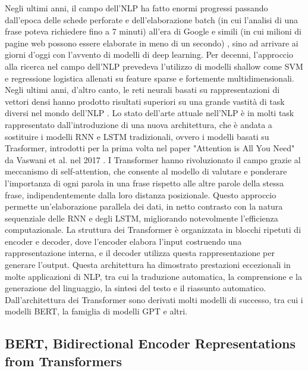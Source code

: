 \documentclass[../../Thesis.tex]{subfiles}
\begin{document}
Negli ultimi  anni, il campo dell'NLP ha fatto enormi progressi passando dall'epoca delle schede perforate e dell'elaborazione batch (in cui l'analisi di una frase poteva richiedere fino a 7 minuti) all'era di Google e simili (in cui milioni di pagine web possono essere elaborate in meno di un secondo) \cite{6786458}, sino ad arrivare ai giorni d'oggi con l'avvento di modelli di deep learning. Per decenni, l'approccio alla ricerca nel campo dell'NLP prevedeva l'utilizzo di modelli shallow come SVM \cite{SVM} e regressione logistica allenati su feature sparse e fortemente multidimensionali. Negli ultimi anni, d'altro canto,  le reti neurali basati su rappresentazioni di vettori densi hanno prodotto risultati superiori su una grande vastità di task diversi nel mondo dell'NLP \cite{TrendsInNLP}. 
Lo stato dell'arte attuale nell'NLP è in molti task rappresentato dall'introduzione di una nuova architettura, che è andata a sostituire i modelli RNN e LSTM \cite{LSTM} tradizionali, ovvero i modelli basati su Trasformer, introdotti per la prima volta nel paper "Attention is All You Need" da Vaswani et al. nel 2017 \cite{AttentionIsAllYouNeed}. I Transformer hanno rivoluzionato il campo grazie al meccanismo di self-attention, che consente al modello di valutare e ponderare l'importanza di ogni parola in una frase rispetto alle altre parole della stessa frase, indipendentemente dalla loro distanza posizionale. Questo approccio permette un'elaborazione parallela dei dati, in netto contrasto con la natura sequenziale delle RNN e degli LSTM, migliorando notevolmente l'efficienza computazionale. La struttura dei Transformer è organizzata in blocchi ripetuti di encoder e decoder, dove l'encoder elabora l'input costruendo una rappresentazione interna, e il decoder utilizza questa rappresentazione per generare l'output. Questa architettura ha dimostrato prestazioni eccezionali in molte applicazioni di NLP, tra cui la traduzione automatica, la comprensione e la generazione del linguaggio, la sintesi del testo e il riassunto automatico. Dall'architettura dei Transformer sono derivati molti modelli di successo, tra cui i modelli BERT, la famiglia di modelli GPT e altri. 
\subsection{BERT, Bidirectional Encoder Representations from Transformers}
\end{document}
